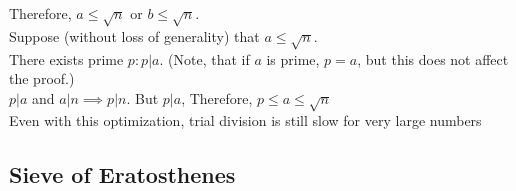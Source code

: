 \documentclass[12pt, titlepage]{article}
\begin{document}
    Therefore, $a \leq \sqrt{n}$ or $b \leq \sqrt{n}$. \\
    Suppose (without loss of generality) that $a \leq \sqrt{n}$.\\
    There exists prime $p: p|a$. (Note, that if $a$ is prime, $p = a$, but this
    does not affect the proof.)\\
    $p|a$ and $a|n \implies p|n$. But $p|a$, Therefore,  $p \leq a \leq \sqrt{n}$\\
    
    Even with this optimization, trial division is still slow for very large
    numbers 

    \subsection{Sieve of Eratosthenes}
\end{document}
